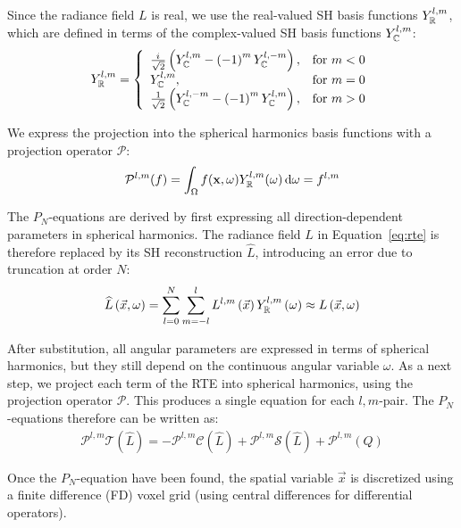 Since the radiance field $L$ is real, we use the real-valued SH basis functions $Y_{\mathbb{R}}^{l,m}$, which are defined in terms of the complex-valued SH basis functions $Y_{\mathbb{C}}^{l,m}$:
\begin{align}
Y_{\mathbb{R}}^{l,m}=
\left\{
\begin{array}{lr}
\frac{{i\mkern1mu}}{\sqrt{2}}\left(Y_{\mathbb{C}}^{l,m}-\left(-1\right)^mY_{\mathbb{C}}^{l,-m}\right), & \text{for } m < 0\\
Y_{\mathbb{C}}^{l,m}, & \text{for } m = 0\\
\frac{1}{\sqrt{2}}\left(Y_{\mathbb{C}}^{l,-m}-\left(-1\right)^mY_{\mathbb{C}}^{l,m}\right), & \text{for } m > 0
\end{array}
\right.
\label{eq:sh_real_basis}
\end{align}

We express the projection into the spherical harmonics basis functions with a projection operator $\mathcal{P}$:
\begin{align}
\mathcal{P}^{l, m}(f) = \int_{\Omega}f(\mathbf{x}, \omega) Y_{\mathbb{R}}^{l,m}(\omega)\,\mathrm{d}\omega = f^{l,m}
\nonumber
\end{align}

The $P_N$-equations are derived by first expressing all direction-dependent parameters in spherical harmonics. The radiance field $L$ in Equation~\ref{eq:rte} is therefore replaced by its SH reconstruction $\widehat{L}$, introducing an error due to truncation at order $N$:
\begin{align}
\widehat{L}\left(\vec{x}, \omega\right) =
\sum_{l=0}^{N}
{
\sum_{m=-l}^{l}
{
L^{l,m}\left(\vec{x}\right)Y_{\mathbb{R}}^{l,m}\left(\omega\right)
}
}
\approx
L\left(\vec{x}, \omega\right)
\nonumber
\end{align}

After substitution, all angular parameters are expressed in terms of spherical harmonics, but they still depend on the continuous angular variable $\omega$. As a next step, we project each term of the RTE into spherical harmonics, using the projection operator $\mathcal{P}$. This produces a single equation for each $l,m$-pair. The $P_N$-equations therefore can be written as:
\begin{align}
\mathcal{P}^{l,m}\mathcal{T}\left(\widehat{L}\right)
=
-\mathcal{P}^{l,m}\mathcal{C}\left(\widehat{L}\right) 
+\mathcal{P}^{l,m}\mathcal{S}\left(\widehat{L}\right)
+\mathcal{P}^{l,m}\left(Q\right)
\label{eq:pn_operator_notation}
\end{align}

Once the $P_N$-equation have been found, the spatial variable $\vec{x}$ is discretized using a finite difference (FD) voxel grid (using central differences for differential operators).

